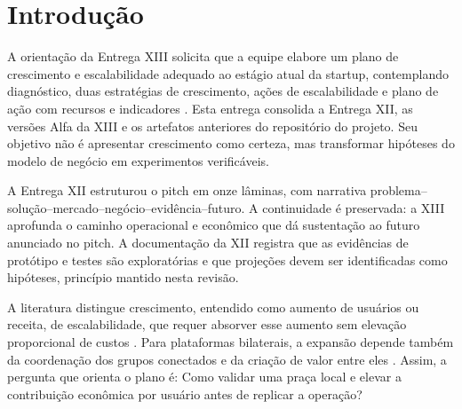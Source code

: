 \section{Introdução}
A orientação da Entrega XIII solicita que a equipe elabore um plano de crescimento e escalabilidade adequado ao estágio atual da startup, contemplando diagnóstico, duas estratégias de crescimento, ações de escalabilidade e plano de ação com recursos e indicadores \cite{pucxiii2026}. Esta entrega consolida a Entrega XII, as versões Alfa da XIII e os artefatos anteriores do repositório do projeto. Seu objetivo não é apresentar crescimento como certeza, mas transformar hipóteses do modelo de negócio em experimentos verificáveis.

A Entrega XII estruturou o pitch em onze lâminas, com narrativa problema--solução--mercado--negócio--evidência--futuro. A continuidade é preservada: a XIII aprofunda o caminho operacional e econômico que dá sustentação ao futuro anunciado no pitch. A documentação da XII registra que as evidências de protótipo e testes são exploratórias e que projeções devem ser identificadas como hipóteses, princípio mantido nesta revisão.

A literatura distingue crescimento, entendido como aumento de usuários ou receita, de escalabilidade, que requer absorver esse aumento sem elevação proporcional de custos \cite{sanasi2023,platformscaling2023}. Para plataformas bilaterais, a expansão depende também da coordenação dos grupos conectados e da criação de valor entre eles \cite{rochet2003,eisenmann2006}. Assim, a pergunta que orienta o plano é: Como validar uma praça local e elevar a contribuição econômica por usuário antes de replicar a operação?